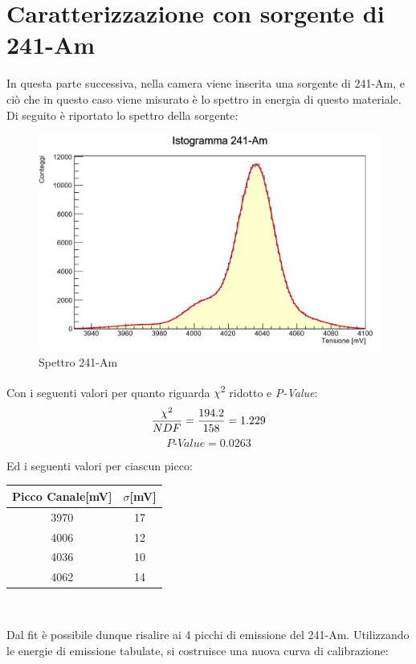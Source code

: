 \documentclass[a4paper,10pt]{article}
\begin{document}
\section{Caratterizzazione con sorgente di 241-Am}
In questa parte successiva, nella camera viene inserita una sorgente di 241-Am, e ci\`o che in questo caso viene misurato \`e lo spettro in energia di questo materiale. Di seguito \`e riportato lo spettro della sorgente:

\begin{figure}[h!]
    \centering
    \includegraphics[scale=0.7]{istoame.jpg}
    \caption{Spettro 241-Am}
\end{figure}

\noindent Con i seguenti valori per quanto riguarda $\chi$\textsuperscript{2} ridotto e \textit{P-Value}:
$$
    \frac{\chi\textsuperscript{2}}{NDF} = \frac{194.2}{158} = 1.229
$$
$$
    \textit{P-Value} = 0.0263
$$

\noindent Ed i seguenti valori per ciascun picco:

\begin{center}
    \begin{tabular}{cc}
        \toprule
        Picco Canale[mV] & $\sigma$[mV] \\
        \midrule
        3970 & 17\\
        4006 & 12\\
        4036 & 10\\
        4062 & 14\\
        \bottomrule
    \end{tabular}\\
\end{center}

\noindent Dal fit \`e possibile dunque risalire ai 4 picchi di emissione del 241-Am. Utilizzando le energie di emissione tabulate, si costruisce una nuova curva di calibrazione:
\end{document}
